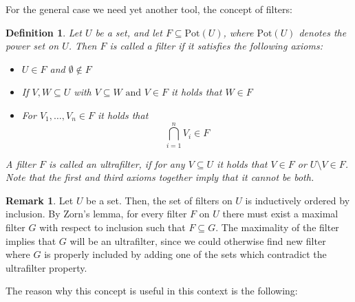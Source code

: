 \documentclass{article}
\theoremstyle{plain}
\newtheorem{defn}[Satz]{Definition}
\theoremstyle{definition}
\newtheorem{rem}[Satz]{Remark}
\begin{document}
For the general case we need yet another tool, the concept of filters:

\begin{defn}
Let $U$ be a set, and let $F \subseteq \text{Pot}(U)$, where $\text{Pot}(U)$ denotes the power set on $U$. Then $F$ is called a \emph{filter} if it satisfies the following axioms: 
\begin{itemize}
\item  $U \in F$ and $\emptyset \notin F$
\item If $V,W \subseteq U$ with $V \subseteq W \text{ and }V  \in F $ it holds that $W \in F$
\item For $V_1, \ldots, V_n \in F$ it holds that \[ \bigcap_{i = 1}^n V_i \in F \]
\end{itemize}
A filter $F$ is called an \emph{ultrafilter}, if for any $V \subseteq U$ it holds that $V \in F$ or $U \setminus V \in F$. Note that the first and third axioms together imply that it cannot be both.
\end{defn}

\begin{rem}
Let $U$ be a set. Then, the set of filters on $U$ is inductively ordered by inclusion. By Zorn's lemma, for every filter $F$ on $U$ there must exist a maximal filter $G$ with respect to inclusion such that $F \subseteq G$.
The maximality of the filter implies that $G$ will be an ultrafilter, since we could otherwise find new filter where $G$ is properly included by adding one of the sets which contradict the ultrafilter property.
\end{rem}

The reason why this concept is useful in this context is the following:
\end{document}
